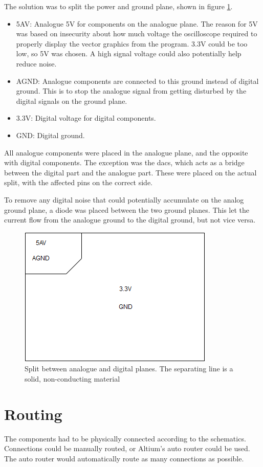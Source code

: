 The solution was to split the power and ground plane, shown in figure \ref{fig:Split planes}.
\begin{itemize}
\item 5AV: Analogue 5V for components on the analogue plane.
The reason for 5V was based on insecurity about how much voltage the oscilloscope required to properly display the vector graphics from the program.
3.3V could be too low, so 5V was chosen.
A high signal voltage could also potentially help reduce noise.
\item AGND: Analogue components are connected to this ground instead of digital ground.
This is to stop the analogue signal from getting disturbed by the digital signals on the ground plane.
\item 3.3V: Digital voltage for digital components.
\item GND: Digital ground.
\end{itemize}

All analogue components were placed in the analogue plane, and the opposite with digital components.
The exception was the \gls{dac}s, which acts as a bridge between the digital part and the analogue part.
These were placed on the actual split, with the affected pins on the correct side.

To remove any digital noise that could potentially accumulate on the analog ground plane, a diode was placed between the two ground planes.
This let the current flow from the analogue ground to the digital ground, but not vice versa.

\begin{figure}[h!]
\centering
\includegraphics[scale = 0.6]{images/Split_planes.png}
\caption{Split between analogue and digital planes. The separating line is a solid, non-conducting material}
\label{fig:Split planes}
\end{figure}

\section{Routing}
The components had to be physically connected according to the schematics.
Connections could be manually routed, or Altium's auto router could be used.
The auto router would automatically route as many connections as possible.

